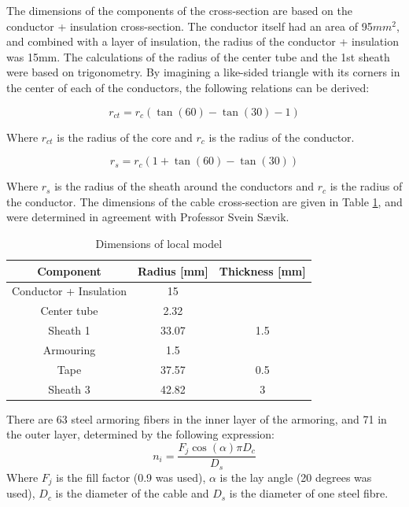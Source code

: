 \noindent The dimensions of the components of the cross-section are based on the conductor + insulation cross-section. The conductor itself had an area of 95$mm^2$, and combined with a layer of insulation, the radius of the conductor + insulation was 15mm.  The calculations of the radius of the center tube and the 1st sheath were based on trigonometry. By imagining a like-sided triangle with its corners in the center of each of the conductors, the following relations can be derived: 


  \begin{equation}
   r_{ct} = r_c (\tan(60)-\tan(30)-1)
\end{equation}

 \noindent Where $r_{ct}$ is the radius of the core and $r_c$ is the radius of the conductor.

 \begin{equation}
   r_{s} = r_c (1+\tan(60)-\tan(30))
\end{equation}
 
  \noindent Where $r_{s}$ is the radius of the sheath around the conductors and $r_c$ is the radius of the conductor. \newline
  \newline 
  \noindent The dimensions of the cable cross-section are given in Table \ref{table:cabledim}, and were determined in agreement with Professor Svein Sævik.  


\begin{table} [H]
\centering
\begin{tabular}{ |c|c|c|}
\hline
Component & Radius [mm] & Thickness [mm] \\
 \hline
 \hline
 Conductor + Insulation & 15 &\\

 Center tube & 2.32& \\
 
 Sheath 1 & 33.07 & 1.5 \\
 
Armouring & 1.5 &  \\

Tape & 37.57 & 0.5 \\

Sheath 3 & 42.82& 3  \\

 \hline
\end{tabular}
\caption{Dimensions of local model}
\label{table:cabledim}
\end{table} 

\noindent There are 63 steel armoring fibers in the inner layer of the armoring, and 71 in the outer layer, determined by the following expression:
\begin{equation}
    n_i=\frac{F_j\cos(\alpha)\pi D_c}{D_s}
\end{equation}
Where $F_j$ is the fill factor (0.9 was used), $\alpha$ is the lay angle (20 degrees was used), $D_c$ is the diameter of the cable and $D_s$ is the diameter of one steel fibre. 

